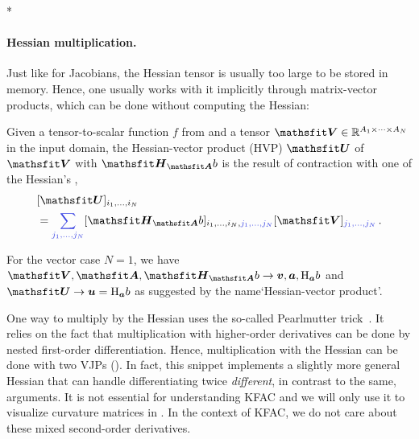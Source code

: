 \switchcolumn[1]*
\switchcolumn[0]

\paragraph{Hessian multiplication.}
Just like for Jacobians, the Hessian tensor is usually too large to be stored in memory.
Hence, one usually works with it implicitly through matrix-vector products, which can be done without computing the Hessian:

\begin{definition}\label{def:hvp}
  Given a tensor-to-scalar function $f$ from  and a tensor $\tV \in \sR^{A_1 \times \dots \times A_N}$ in the input domain, the Hessian-vector product (HVP) $\tU$ of $\tV$ with $\tH_{\tA}b$ is the result of contraction with one of the Hessian's ,
  \begin{align*}
     & [\tU]_{i_1, \dots, i_N}
    \\
     & =
    \colored{\sum_{j_1, \dots, j_N}}
    [\tH_{\tA}b]_{i_1, \dots, i_N, \colored{j_1, \dots, j_N}} [\tV]_{\colored{j_1, \dots, j_N}}\,.
  \end{align*}
\end{definition}
For the vector case $N=1$, we have $\tV, \tA, \tH_{\tA}b \to \vv, \va, \hess_{\va}b$ and $\tU \to \vu = \hess_{\va} b$ as suggested by the name`Hessian-vector product'.

One way to multiply by the Hessian uses the so-called Pearlmutter trick~\cite{pearlmutter1994fast}.
It relies on the fact that multiplication with higher-order derivatives can be done by nested first-order differentiation.
Hence, multiplication with the Hessian can be done with two VJPs ().
In fact, this snippet implements a slightly more general Hessian that can handle differentiating twice \wrt \emph{different}, in contrast to the same, arguments.
It is not essential for understanding KFAC and we will only use it to visualize curvature matrices in .
In the context of KFAC, we do not care about these mixed second-order derivatives.

